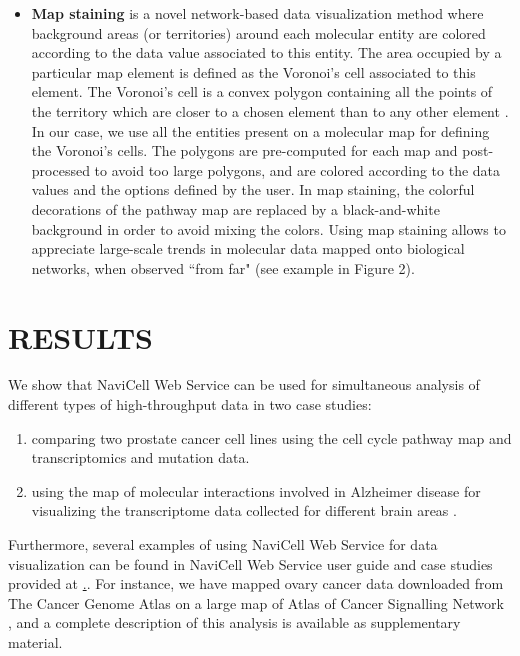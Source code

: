 \documentclass[a4,center,fleqn]{NAR}
\begin{document}
\begin{itemize}
\item \textbf{Map staining} is a novel network-based data visualization method where
background areas (or territories) around each molecular entity are colored according to the data
value associated to this entity. The area occupied by a particular map element is defined as the Voronoi's cell
associated to this element. The Voronoi's cell is a convex polygon containing all the points
of the territory which are closer to a chosen element than to any other element
\cite{aurenhammer1991voronoi}. In our case, we use all the entities present on a molecular map
for defining the Voronoi's cells. The polygons are pre-computed for each map and post-processed
to avoid too large polygons, and are colored according to the data values and the options
defined by the user. In map staining, the colorful decorations of the pathway map
are replaced by a black-and-white background in order to avoid mixing the colors.
Using map staining allows to appreciate large-scale trends in molecular data mapped
onto biological networks, when observed ``from far" (see example in Figure 2).

\end{itemize}



\section{RESULTS}

We show that NaviCell Web Service can be used for simultaneous analysis of
different types of high-throughput data in two case studies:
\begin{enumerate}
\item comparing two prostate cancer cell lines using the cell cycle pathway map
and transcriptomics and mutation data.

\item using the map of molecular interactions involved in Alzheimer disease
\cite{Mizuno2012} for visualizing the transcriptome data collected for
different brain areas \cite{Hokama2014}.
\end{enumerate}

Furthermore, several examples of using NaviCell Web Service for data
visualization can be found in NaviCell Web Service user guide and case studies
provided at \href{http://navicell.curie.fr/pages/nav\_web\_service.html}.. For
instance, we have mapped ovary cancer data downloaded from The Cancer Genome
Atlas \cite{TCGA2011Ovarian} on a  large map of Atlas of Cancer Signalling
Network \cite{Kuperstein2015}, and a complete description of this analysis is
available as supplementary material.
\end{document}
